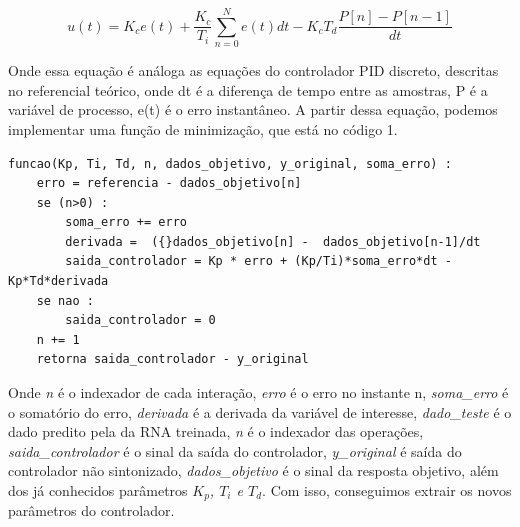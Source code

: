 \begin{equation}\label{eq:motor_accel}
u(t) = K_c e(t) + \frac{K_c}{T_i}\sum_{n=0}^{N}{e(t)dt}-K_cT_d\frac{P[n]-P[n-1]}{dt}
\end{equation}

Onde essa equação é análoga as equações do controlador PID discreto, descritas no referencial teórico, onde dt é a diferença de tempo entre as amostras, P é a variável de processo, e(t) é o erro instantâneo. A partir dessa equação, podemos implementar uma função de minimização, que está no código 1.

\begin{lstlisting}[caption={Minimização da função do controlador PID}]
funcao(Kp, Ti, Td, n, dados_objetivo, y_original, soma_erro) :
    erro = referencia - dados_objetivo[n]
    se (n>0) :
        soma_erro += erro
        derivada =  ({}dados_objetivo[n] -  dados_objetivo[n-1]/dt
        saida_controlador = Kp * erro + (Kp/Ti)*soma_erro*dt - Kp*Td*derivada
    se nao :
        saida_controlador = 0
    n += 1
    retorna saida_controlador - y_original
\end{lstlisting}

Onde \textit{n} é o indexador de cada interação, \textit{erro} é o erro no instante n, \textit{soma\_erro} é o somatório do erro, \textit{derivada} é a derivada da variável de interesse, \textit{dado\_teste} é o dado predito pela da RNA treinada, \textit{n} é o indexador das operações, \textit{saida\_controlador} é o sinal da saída do controlador, \textit{y\_original} é saída do controlador não sintonizado, \textit{dados\_objetivo} é o sinal da resposta objetivo, além dos já conhecidos parâmetros \textit{$K_p$, $T_i$ e $T_d$}. Com isso, conseguimos extrair os novos parâmetros do controlador.

